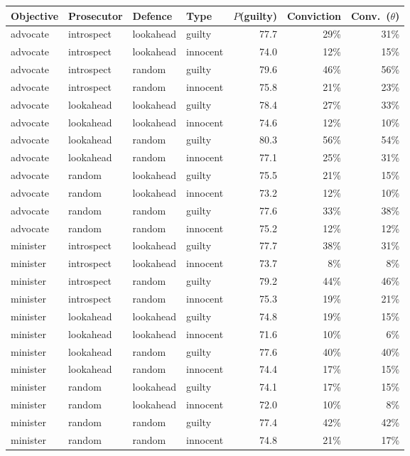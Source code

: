\begin{tabular}{@{}llllrrr@{}}\toprule
Objective & Prosecutor & Defence & Type & $P$(guilty) & Conviction & Conv.\ ($\theta$)\\\midrule
advocate & introspect & lookahead & guilty & 77.7 & 29\% & 31\%\\
advocate & introspect & lookahead & innocent & 74.0 & 12\% & 15\%\\
advocate & introspect & random & guilty & 79.6 & 46\% & 56\%\\
advocate & introspect & random & innocent & 75.8 & 21\% & 23\%\\
advocate & lookahead & lookahead & guilty & 78.4 & 27\% & 33\%\\
advocate & lookahead & lookahead & innocent & 74.6 & 12\% & 10\%\\
advocate & lookahead & random & guilty & 80.3 & 56\% & 54\%\\
advocate & lookahead & random & innocent & 77.1 & 25\% & 31\%\\
advocate & random & lookahead & guilty & 75.5 & 21\% & 15\%\\
advocate & random & lookahead & innocent & 73.2 & 12\% & 10\%\\
advocate & random & random & guilty & 77.6 & 33\% & 38\%\\
advocate & random & random & innocent & 75.2 & 12\% & 12\%\\
minister & introspect & lookahead & guilty & 77.7 & 38\% & 31\%\\
minister & introspect & lookahead & innocent & 73.7 & 8\% & 8\%\\
minister & introspect & random & guilty & 79.2 & 44\% & 46\%\\
minister & introspect & random & innocent & 75.3 & 19\% & 21\%\\
minister & lookahead & lookahead & guilty & 74.8 & 19\% & 15\%\\
minister & lookahead & lookahead & innocent & 71.6 & 10\% & 6\%\\
minister & lookahead & random & guilty & 77.6 & 40\% & 40\%\\
minister & lookahead & random & innocent & 74.4 & 17\% & 15\%\\
minister & random & lookahead & guilty & 74.1 & 17\% & 15\%\\
minister & random & lookahead & innocent & 72.0 & 10\% & 8\%\\
minister & random & random & guilty & 77.4 & 42\% & 42\%\\
minister & random & random & innocent & 74.8 & 21\% & 17\%\\
\bottomrule\end{tabular}
